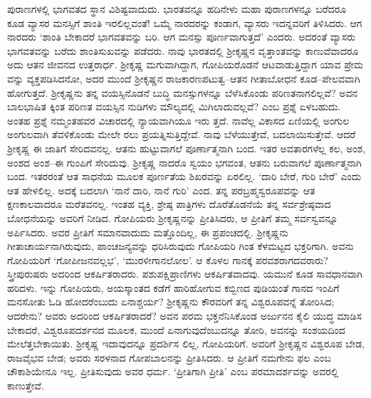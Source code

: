 ಪುರಾಣಗಳಲ್ಲಿ ಭಾಗವತದ ಸ್ಥಾನ ವಿಶಿಷ್ಟವಾದುದು. ಭಾರತವನ್ನೂ ಹದಿನೇಳು ಮಹಾ ಪುರಾಣಗಳನ್ನೂ ಬರೆದರೂ ಕೂಡ ವ್ಯಾಸರ ಮನಸ್ಸಿಗೆ ಶಾಂತಿ ಇರಲಿಲ್ಲವಂತೆ! ಒಮ್ಮೆ ನಾರದರನ್ನು ಕಂಡಾಗ, ವ್ಯಾಸರು ಇದನ್ನವರಿಗೆ ತಿಳಿಸಿದರು. ಆಗ ನಾರದರು ‘ಶಾಂತಿ ಬೇಕಾದರೆ ಭಾಗವತವನ್ನು ಬರಿ. ಆಗ ಮನಸ್ಸು ಪೂರ್ಣವಾಗುತ್ತದೆ’ ಎಂದರು. ಅದರಂತೆ ವ್ಯಾಸರು ಭಾಗವತವನ್ನು ಬರೆದು ಶಾಂತಿಸುಖವನ್ನು ಪಡೆದರು. ನಾವು ಭಾರತದಲ್ಲಿ ಶ್ರೀಕೃಷ್ಣನ ವೃತ್ತಾಂತವನ್ನು ಕಾಣುವೆವಾದರೂ ಅದು ಆತನ ಜೀವನದ ಉತ್ತರಾರ್ಧ. ಶ್ರೀಕೃಷ್ಣ ಮಗುವಾಗಿದ್ದಾಗ, ಗೋಪಿಯರೊಡನೆ ಆಟವಾಡುತ್ತಿದ್ದಾಗ ಯಾವ ಪ್ರೇಮ ವನ್ನು ವ್ಯಕ್ತಪಡಿಸಿದನೋ, ಅದರ ಮುಂದೆ ಶ್ರೀಕೃಷ್ಣನ ರಾಜಕಾರಣಪಟುತ್ವ–ಆತನ ಗೀತಾಬೋಧನೆ ಕೂಡ–ಪೇಲವವಾಗಿ ಹೋಗುತ್ತದೆ. ಶ್ರೀಕೃಷ್ಣನು ತನ್ನ ವಯಸ್ಸಿನೊಡನೆ ಬುದ್ಧಿ ಮನಸ್ಸುಗಳನ್ನೂ ಬೆಳೆಸಿಕೊಂಡು ಪರಿಣತನಾಗಲಿಲ್ಲವೆ? ಅವನ ಬಾಲಭಾಷಿತ ಕ್ಕಿಂತ ಪರಿಣತ ವಯಸ್ಸಿನ ನುಡಿಗಳು ಮೌಲ್ಯದಲ್ಲಿ ಮಿಗಿಲಾದುವಲ್ಲವೆ? ಎಂಬ ಪ್ರಶ್ನೆ ಏಳಬಹುದು. ಅಂತಹ ಪ್ರಶ್ನೆ ನಮ್ಮಂತಹವರ ವಿಚಾರದಲ್ಲಿ ನ್ಯಾಯವಾಗಿಯೂ ಇರು ತ್ತದೆ. ನಾವೆಲ್ಲ ವಿಕಾಸದ ಏಣಿಯಲ್ಲಿ ಅಂಗುಲ ಅಂಗುಲವಾಗಿ ತೆವಳಿಕೊಂಡು ಮೇಲೇ ರಲು ಪ್ರಯತ್ನಿಸುತ್ತಿದ್ದೇವೆ. ನಾವು ಬೆಳೆಯುತ್ತೇವೆ, ಬದಲಾಯಿಸುತ್ತೇವೆ. ಆದರೆ ಶ್ರೀಕೃಷ್ಣ ಈ ಜಾತಿಗೆ ಸೇರಿದವನಲ್ಲ. ಆತನು ಹುಟ್ಟುವಾಗಲೆ ಪೂರ್ಣಾತ್ಮನಾಗಿ ಬಂದ. ಇತರ ಅವತಾರಗಳೆಲ್ಲ ಕಲ, ಅಂಶ, ಅಂಶದ ಅಂಶ–ಈ ಗುಂಪಿಗೆ ಸೇರಿದುವು. ಶ್ರೀಕೃಷ್ಣ ನಾದರೊ ಸ್ವಯಂ ಭಗವಂತ, ಆತನು ಬರುವಾಗಲೆ ಪೂರ್ಣಾತ್ಮನಾಗಿ ಬಂದ. ಇತರರಂತೆ ಆತ ಸಾಧನೆಯ ಮೂಲಕ ಪೂರ್ಣತೆಯ ಶಿಖರವನ್ನು ಏರಲಿಲ್ಲ. ‘ದಾರಿ ಬೇರೆ, ಗುರಿ ಬೇರೆ’ ಎಂದು ಆತ ಹೇಳಲಿಲ್ಲ. ಅದಕ್ಕೆ ಬದಲಾಗಿ ‘ನಾನೆ ದಾರಿ, ನಾನೆ ಗುರಿ’ ಎಂದ. ತನ್ನ ಪರಬ್ರಹ್ಮಸ್ವರೂಪವನ್ನು ಆತ ಕ್ಷಣಕಾಲವಾದರೂ ಮರೆತವನಲ್ಲ. ಇಂತಹ ವ್ಯಕ್ತಿ, ಶ್ರೇಷ್ಠ ಪಾತ್ರಿಗಳು ದೊರೆತೊಡನೆಯೆ ತನ್ನ ಸರ್ವಶ್ರೇಷ್ಠವಾದ ಬೋಧನೆಯನ್ನು ಅವರಿಗೆ ನೀಡಿದ. ಗೋಪಿಯರು ಶ್ರೀಕೃಷ್ಣನನ್ನು ಪ್ರೀತಿಸಿದರು, ಆ ಪ್ರೀತಿಗೆ ತಮ್ಮ ಸರ್ವಸ್ವವನ್ನೂ ಅರ್ಪಿಸಿದರು. ಅವರ ಪ್ರೀತಿಗೆ ಸಮಾನವಾದುದು ಮತ್ತೊಂದಿಲ್ಲ, ಈ ಪ್ರಪಂಚದಲ್ಲಿ. ಶ್ರೀಕೃಷ್ಣನು ಗೀತಾಚಾರ್ಯನಾಗಿರುವುದು, ಪಾಂಚಜನ್ಯವನ್ನು ಧರಿಸಿರುವುದು ಗೋಪಿಯರಿ ಗಿಂತ ಕೆಳಮಟ್ಟದ ಭಕ್ತರಿಗಾಗಿ. ಅವನು ಗೋಪಿಯರಿಗೆ ‘ಗೋಪೀಜನವಲ್ಲಭ’, ‘ಮುರಳೀಗಾನಲೋಲ’. ಆ ಕೊಳಲ ಗಾನಕ್ಕೆ ಪರವಶರಾಗದವರಾರು? ಸ್ತ್ರೀಪುರುಷರು ಅದರಿಂದ ಆಕರ್ಷಿತರಾದರು. ಪಶುಪಕ್ಷಿಪ್ರಾಣಿಗಳು ಆಕರ್ಷಿತವಾದವು. ಯಮುನೆ ಕೂಡ ಸಾವಧಾನವಾಗಿ ಹರಿದಳು. ಇನ್ನು ಗೋಪಿಯರು, ಅಯಸ್ಕಾಂತದ ಕಡೆಗೆ ಹಾರಿಹೋಗುವ ಕಬ್ಬಿಣದ ಪುಡಿಯಂತೆ ಗಾನದ ಇಂಪಿಗೆ ಮನಸೋತು ಓಡಿ ಹೋದರೆಂಬುದು ಏನಾಶ್ಚರ್ಯ? ಶ್ರೀಕೃಷ್ಣನು ಕೌರವರಿಗೆ ತನ್ನ ವಿಶ್ವರೂಪವನ್ನೆ ತೋರಿಸಿದ; ಆದರೇನು? ಅವರು ಅದರಿಂದ ಆಕರ್ಷಿತರಾದರೆ? ಅವನ ಪರಮ ಭಕ್ತನೆನಿಸಿಕೊಂಡ ಅರ್ಜುನನ ಕೈಲಿ ಯುದ್ಧ ಮಾಡಿಸ ಬೇಕಾದರೆ, ವಿಶ್ವರೂಪದರ್ಶನದ ಮೂಲಕ, ಮುಂದೆ ಏನಾಗುವುದೆಂಬುದನ್ನೂ ತೋರಿ, ಅವನನ್ನು ಸಂಶಯದಿಂದ ಮೇಲೆತ್ತಬೇಕಾಯಿತು. ಶ್ರೀಕೃಷ್ಣ ಇದಾವುದನ್ನೂ ಪ್ರದರ್ಶಿಸ ಲಿಲ್ಲ, ಗೋಪಿಯರಿಗೆ. ಅವರಿಗೆ ಶ್ರೀಕೃಷ್ಣನ ವಿಶ್ವರೂಪ ಬೇಡ, ರಾಜವೈಭವ ಬೇಡ; ಅವರು ಸರಳನಾದ ಗೋಪಬಾಲನನ್ನು ಪ್ರೀತಿಸಿದರು. ಆ ಪ್ರೀತಿಗೆ ನಮಗೇನು ಫಲ ಎಂಬ ಚೌಕಾಶಿಯೇನೂ ಇಲ್ಲ. ಪ್ರೀತಿಸುವುದು ಅವರ ಧರ್ಮ. ‘ಪ್ರೀತಿಗಾಗಿ ಪ್ರೀತಿ’ ಎಂಬ ಪರಮಾದರ್ಶವನ್ನು ಅವರಲ್ಲಿ ಕಾಣುತ್ತೇವೆ.

